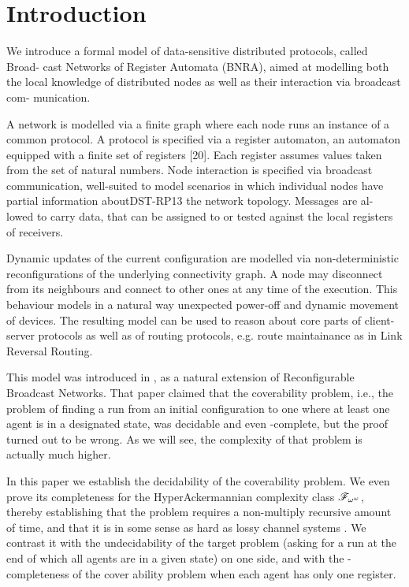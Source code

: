\section{Introduction}

We introduce a formal model of data-sensitive distributed protocols, called Broad-
cast Networks of Register Automata (BNRA), aimed at modelling both the local
knowledge of distributed nodes as well as their interaction via broadcast com-
munication. 


A network is modelled via a finite graph where each node runs an
instance of a common protocol. A protocol is specified via a register automaton,
an automaton equipped with a finite set of registers [20]. Each register assumes
values taken from the set of natural numbers. Node interaction is specified via
broadcast communication, well-suited to model scenarios in which individual
nodes have partial information aboutDST-RP13 the network topology. Messages are al-
lowed to carry data, that can be assigned to or tested against the local registers
of receivers. 

Dynamic updates of the current configuration are modelled via
non-deterministic reconfigurations of the underlying connectivity graph. A node
may disconnect from its neighbours and connect to other ones at any time of the
execution. This behaviour models in a natural way unexpected power-off and
dynamic movement of devices. The resulting model can be used to reason about
core parts of client-server protocols as well as of routing protocols, e.g. route
maintainance as in Link Reversal Routing.

This model was introduced in \cite{DST2013}, as a natural extension of Reconfigurable Broadcast Networks. That paper claimed that the coverability problem, i.e., the problem of finding a run from an initial configuration to one where at least one agent is in a designated state, was decidable and even \PSPACE-complete, but the proof turned out to be wrong. As we will see, the complexity of that problem is actually much higher.

In this paper we establish the decidability of the coverability problem. We even prove its completeness for the HyperAckermannian complexity class $\mathscr{F}_{\omega^\omega}$, thereby establishing that the problem requires a non-multiply recursive amount of time, and that it is in some sense as hard as lossy channel systems . 
We contrast it with the undecidability of the target problem (asking for a run at the end of which all agents are in a given state) on one side, and with the \NP-completeness of the cover ability problem when each agent has only one register. 

